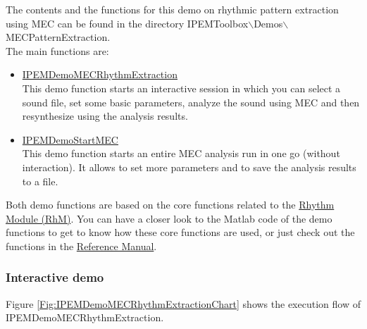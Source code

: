 The contents and the functions for this demo on rhythmic pattern
extraction using MEC can be found in the directory
IPEMToolbox$\backslash$Demos$\backslash$MECPatternExtraction.\\
The main functions are:
\begin{itemize}
\item \hyperlink{FuncRef:IPEMDemoMECRhythmExtraction}{IPEMDemoMECRhythmExtraction}\\
    This demo function starts an interactive session in which you can
    select a sound file, set some basic parameters, analyze the sound using
    MEC and then resynthesize using the analysis results.
\item \hyperlink{FuncRef:IPEMDemoStartMEC}{IPEMDemoStartMEC}\\
    This demo function starts an entire MEC analysis run in one go
    (without interaction). It allows to set more parameters and to save
    the analysis results to a file.
\end{itemize}
Both demo functions are based on the core functions related to the
\hyperlink{Concepts:RhythmModule}{Rhythm Module (RhM)}. You can
have a closer look to the Matlab code of the demo functions to get
to know how these core functions are used, or just check out the
functions in the \hyperlink{Part:ReferenceManual}{Reference
Manual}.


\subsubsection*{Interactive demo}

Figure \ref{Fig:IPEMDemoMECRhythmExtractionChart} shows the
execution flow of IPEMDemoMECRhythmExtraction.

